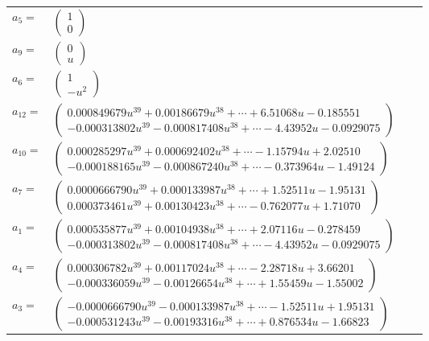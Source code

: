 \documentclass[1p]{elsarticle_modified}
\theoremstyle{definition}
\begin{document}
\begin{tabular}{m{7pt} m{180pt} m{7pt} m{180pt} }
\flushright $a_{5}=$&$\begin{pmatrix}1\\0\end{pmatrix}$ \\
\flushright $a_{9}=$&$\begin{pmatrix}0\\u\end{pmatrix}$ \\
\flushright $a_{6}=$&$\begin{pmatrix}1\\- u^2\end{pmatrix}$ \\
\flushright $a_{12}=$&$\begin{pmatrix}0.000849679 u^{39}+0.00186679 u^{38}+\cdots+6.51068 u-0.185551\\-0.000313802 u^{39}-0.000817408 u^{38}+\cdots-4.43952 u-0.0929075\end{pmatrix}$ \\
\flushright $a_{10}=$&$\begin{pmatrix}0.000285297 u^{39}+0.000692402 u^{38}+\cdots-1.15794 u+2.02510\\-0.000188165 u^{39}-0.000867240 u^{38}+\cdots-0.373964 u-1.49124\end{pmatrix}$ \\
\flushright $a_{7}=$&$\begin{pmatrix}0.0000666790 u^{39}+0.000133987 u^{38}+\cdots+1.52511 u-1.95131\\0.000373461 u^{39}+0.00130423 u^{38}+\cdots-0.762077 u+1.71070\end{pmatrix}$ \\
\flushright $a_{1}=$&$\begin{pmatrix}0.000535877 u^{39}+0.00104938 u^{38}+\cdots+2.07116 u-0.278459\\-0.000313802 u^{39}-0.000817408 u^{38}+\cdots-4.43952 u-0.0929075\end{pmatrix}$ \\
\flushright $a_{4}=$&$\begin{pmatrix}0.000306782 u^{39}+0.00117024 u^{38}+\cdots-2.28718 u+3.66201\\-0.000336059 u^{39}-0.00126654 u^{38}+\cdots+1.55459 u-1.55002\end{pmatrix}$ \\
\flushright $a_{3}=$&$\begin{pmatrix}-0.0000666790 u^{39}-0.000133987 u^{38}+\cdots-1.52511 u+1.95131\\-0.000531243 u^{39}-0.00193316 u^{38}+\cdots+0.876534 u-1.66823\end{pmatrix}$ \\

\end{tabular}
\end{document}
